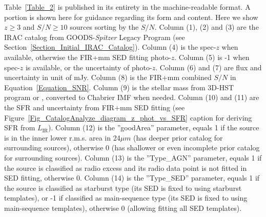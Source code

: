 \begin{table*}
\begin{center}
\begin{minipage}{0.95\textwidth}
    Table~\ref{Table_2} is published in its entirety in the machine-readable format. 
    A portion is shown here for guidance regarding its form and content. 
    Here we show $z \ge 3$ and $S/N \ge 10$ sources sorting by the $S/N$. 
    Column (1), (2) and (3) are the IRAC catalog from GOODS-\textit{Spitzer} Legacy Program 
    (see Section~\ref{Section_Initial_IRAC_Catalog}). 
    Column (4) is the spec-$z$ when available,  
    otherwise the FIR+mm SED fitting photo-$z$.  
    Column (5) is -1 when spec-$z$ is available,  
    or the uncertainty of photo-$z$.  
    Column (6) and (7) are flux and uncertainty in unit of mJy.  
    Column (8) is the FIR+mm combined $S/N$ in Equation~\ref{Equation_SNR}.  
    Column (9) is the stellar mass from 3D-HST program or \citet{Pannella2015},  
    converted to Chabrier IMF when needed.  
    Column (10) and (11) are the SFR and uncertainty from FIR+mm SED fitting  
    (see Figure~\ref{Fig_CatalogAnalyze_diagram_z_phot_vs_SFR}  
    caption for deriving SFR from $L_{\mathrm{IR}}$).  
    Column (12) is the ''goodArea'' parameter,  
    equals 1 if the source is in the inner lower r.m.s. area in 24${\mu}m$  
    (has deeper prior catalog for surrounding sources),  
    otherwise 0 (has shallower or even incomplete prior catalog for surrounding sources).  
    Column (13) is the ''Type\_AGN'' parameter,  
    equals 1 if the source is classified as radio excess and  
    its radio data point is not fitted in SED fitting, otherwise 0.  
    Column (14) is the ''Type\_SED'' parameter,  
    equals 1 if the source is classified as starburst type  
    (its SED is fixed to using starburst templates),  
    or -1 if classified as main-sequence type  
    (its SED is fixed to using main-sequence templates), 
    otherwise 0 (allowing fitting all SED templates). 
    
\end{minipage}

\end{center}

\end{table*}

